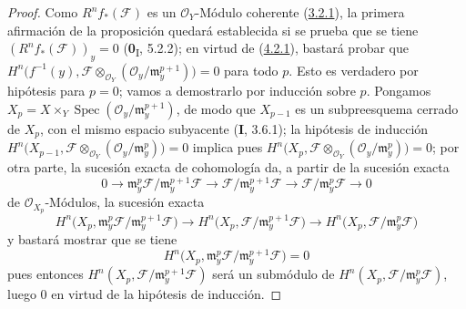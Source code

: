 \documentclass[10pt,oneside,openany]{book}
\theoremstyle{egaenv}\newtheorem*{env}{---}
\theoremstyle{egastatement}
\theoremstyle{egadescription}
\begin{document}
\begin{proof}
Como $R^nf_*(\mathcal F)$ es un $\mathcal O_Y$-Módulo coherente
(\hyperref[III.3.2.1-fr]{3.2.1}), la primera afirmación de la proposición
quedará establecida si se prueba que se tiene
$(R^nf_*(\mathcal F))_y=0$ (\textbf{0}\textsubscript{I}, 5.2.2); en virtud de
(\hyperref[III.4.2.1-fr]{4.2.1}), bastará probar que
$H^n\bigl(f^{-1}(y),\mathcal F\otimes_{\mathcal O_Y}
(\mathcal O_y/\mathfrak m_y^{p+1})\bigr)=0$
para todo $p$. Esto es verdadero por hipótesis para $p=0$; vamos a demostrarlo
por inducción sobre $p$. Pongamos
$X_p=X\times_Y\operatorname{Spec}
(\mathcal O_y/\mathfrak m_y^{p+1})$,
de modo que $X_{p-1}$ es un subpreesquema cerrado de $X_p$, con el mismo
espacio subyacente (\textbf{I}, 3.6.1); la hipótesis de inducción
$H^n\bigl(X_{p-1},\mathcal F\otimes_{\mathcal O_Y}
(\mathcal O_y/\mathfrak m_y^p)\bigr)=0$
implica pues
$H^n\bigl(X_p,\mathcal F\otimes_{\mathcal O_Y}
(\mathcal O_y/\mathfrak m_y^p)\bigr)=0$;
por otra parte, la sucesión exacta de cohomología da, a partir de la sucesión
exacta
\[
0\longrightarrow
\mathfrak m_y^p\mathcal F/\mathfrak m_y^{p+1}\mathcal F
\longrightarrow
\mathcal F/\mathfrak m_y^{p+1}\mathcal F
\longrightarrow
\mathcal F/\mathfrak m_y^p\mathcal F
\longrightarrow0
\]
de $\mathcal O_{X_p}$-Módulos, la sucesión exacta
\[
H^n\bigl(X_p,
\mathfrak m_y^p\mathcal F/\mathfrak m_y^{p+1}\mathcal F\bigr)
\longrightarrow
H^n\bigl(X_p,\mathcal F/\mathfrak m_y^{p+1}\mathcal F\bigr)
\longrightarrow
H^n\bigl(X_p,\mathcal F/\mathfrak m_y^p\mathcal F\bigr)
\]
y bastará mostrar que se tiene
\[
\label{III.4.6.1.1-fr}
H^n\bigl(X_p,
\mathfrak m_y^p\mathcal F/\mathfrak m_y^{p+1}\mathcal F\bigr)=0
\tag{4.6.1.1}
\]
pues entonces $H^n(X_p,\mathcal F/\mathfrak m_y^{p+1}\mathcal F)$ será un
submódulo de $H^n(X_p,\mathcal F/\mathfrak m_y^p\mathcal F)$, luego $0$ en
virtud de la hipótesis de inducción.


\end{proof}
\end{document}
